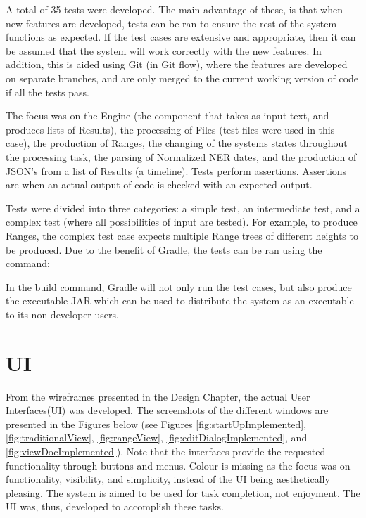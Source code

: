 \par A total of 35 tests were developed. The main advantage of these, is that when new features are developed, tests can be ran to ensure the rest of the system functions as expected. If the test cases are extensive and appropriate, then it can be assumed that the system will work correctly with the new features. In addition, this is aided using Git (in Git flow), where the features are developed on separate branches, and are only merged to the current working version of code if all the tests pass.

\par The focus was on the Engine (the component that takes as input text, and produces lists of Results), the processing of Files (test files were used in this case), the production of Ranges, the changing of the systems states throughout the processing task, the parsing of Normalized NER dates, and the production of JSON's from a list of Results (a timeline). Tests perform assertions. Assertions are when an actual output of code is checked with an expected output.

\par Tests were divided into three categories: a simple test, an intermediate test, and a complex test (where all possibilities of input are tested). For example, to produce Ranges, the complex test case expects multiple Range trees of different heights to be produced. Due to the benefit of Gradle, the tests can be ran using the command:\par
{}
In the build command, Gradle will not only run the test cases, but also produce the executable JAR which can be used to distribute the system as an executable to its non-developer users.

\section{UI}
\par From the wireframes presented in the Design Chapter, the actual User Interfaces(UI) was developed. The screenshots of the different windows are presented in the Figures below (see Figures \ref{fig:startUpImplemented}, \ref{fig:traditionalView}, \ref{fig:rangeView}, \ref{fig:editDialogImplemented}, and \ref{fig:viewDocImplemented}). Note that the interfaces provide the requested functionality through buttons and menus. Colour is missing as the focus was on functionality, visibility, and simplicity, instead of the UI being aesthetically pleasing. The system is aimed to be used for task completion, not enjoyment. The UI was, thus, developed to accomplish these tasks.

